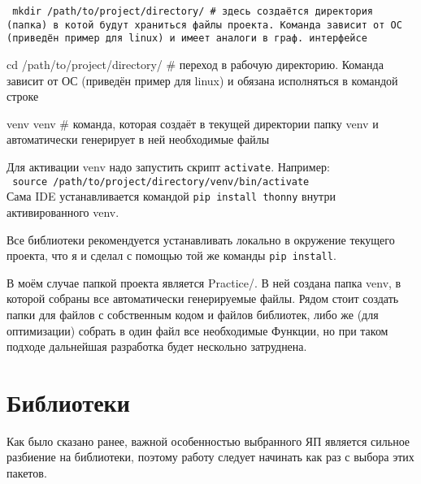{\tt
    \noindent\hangindent=5mm
    mkdir /path/to/project/directory/ \# здесь создаётся директория (папка) в котой будут храниться файлы проекта. Команда зависит от ОС (приведён пример для linux) и имеет аналоги в граф. интерфейсе

    \noindent\hangindent=5mm
    cd /path/to/project/directory/ \# переход в рабочую директорию. Команда зависит от ОС (приведён пример для linux) и обязана исполняться в командой строке

    \noindent\hangindent=5mm
    venv venv \# команда, которая создаёт в текущей директории папку venv и автоматически генерирует в ней необходимые файлы

}
\noindent Для активации venv надо запустить скрипт \texttt{activate}. Например:\\
\texttt{
    source /path/to/project/directory/venv/bin/activate
}\\
Сама IDE устанавливается командой \texttt{pip install thonny} внутри активированного venv.

Все библиотеки рекомендуется устанавливать локально в окружение текущего проекта, что я и сделал с помощью той же команды \texttt{pip install}.

В моём случае папкой проекта является Practice/. В ней создана папка venv, в которой собраны все автоматически генерируемые файлы. Рядом стоит создать папки для файлов с собственным кодом и файлов библиотек, либо же (для оптимизации) собрать в один файл все необходимые Функции, но при таком подходе дальнейшая разработка будет нескольно затруднена.

\section{Библиотеки}
Как было сказано ранее, важной особенностью выбранного ЯП является сильное разбиение на библиотеки, поэтому работу следует начинать как раз с выбора этих пакетов.

